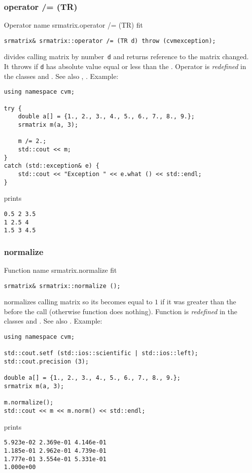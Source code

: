 \subsubsection{operator /= (TR)}
Operator%
\pdfdest name {srmatrix.operator /= (TR)} fit
\begin{verbatim}
srmatrix& srmatrix::operator /= (TR d) throw (cvmexception);
\end{verbatim}
divides  calling matrix by  number~\verb"d"
and returns  reference to
the matrix changed.
It throws  
if \verb"d" has  absolute value equal or less
than the 
.
Operator is \emph{redefined} in the classes
and .
See also ,
.
Example:
\begin{Verbatim}
using namespace cvm;

try {
    double a[] = {1., 2., 3., 4., 5., 6., 7., 8., 9.};
    srmatrix m(a, 3);

    m /= 2.;
    std::cout << m;
}
catch (std::exception& e) {
    std::cout << "Exception " << e.what () << std::endl;
}
\end{Verbatim}
prints
\begin{Verbatim}
0.5 2 3.5
1 2.5 4
1.5 3 4.5
\end{Verbatim}
\newpage


\subsubsection{normalize}
Function%
\pdfdest name {srmatrix.normalize} fit
\begin{verbatim}
srmatrix& srmatrix::normalize ();
\end{verbatim}
normalizes  calling matrix so its 
becomes equal to $1$ if it was greater than the 
before the call (otherwise function does nothing).
Function is \emph{redefined} in the classes
and .
See also .
Example:
\begin{Verbatim}
using namespace cvm;

std::cout.setf (std::ios::scientific | std::ios::left); 
std::cout.precision (3);

double a[] = {1., 2., 3., 4., 5., 6., 7., 8., 9.};
srmatrix m(a, 3);

m.normalize();
std::cout << m << m.norm() << std::endl;
\end{Verbatim}
prints
\begin{Verbatim}
5.923e-02 2.369e-01 4.146e-01
1.185e-01 2.962e-01 4.739e-01
1.777e-01 3.554e-01 5.331e-01
1.000e+00
\end{Verbatim}
\newpage



